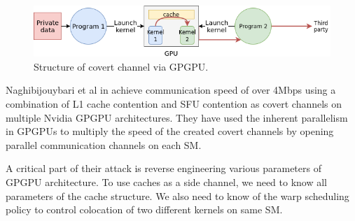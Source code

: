 \begin{figure}[h]
\centering
\includegraphics[width=\textwidth]{figures/covert_channel}
\caption[Covert channel on GPGPU]{Structure of covert channel via GPGPU.}
\label{fig:gpgpu}
\end{figure}

Naghibijouybari et al in  achieve communication speed of
over 4Mbps using a combination of L1 cache contention and SFU contention as
covert channels on multiple Nvidia GPGPU architectures. They have used the
inherent parallelism in GPGPUs to multiply the speed of the created covert
channels by opening parallel communication channels on each SM.

A critical part of their attack is reverse engineering various parameters of
GPGPU architecture. To use caches as a side channel, we need to know all
parameters of the cache structure. We also need to know of the warp scheduling
policy to control colocation of two different kernels on same SM.


